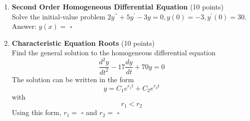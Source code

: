 \begin{enumerate}
  \item \textbf{Second Order Homogeneous Differential Equation} (10 points)\\
  Solve the initial-value problem $2 y^{\prime \prime}+5 y^{\prime}-3 y=0, y(0)=-3, y^{\prime}(0)=30$.\\
  Answer: $y(x)=$ $\square$\\
  \begin{subanswer}
  \end{subanswer}

  \item \textbf{Characteristic Equation Roots} (10 points)\\
  Find the general solution to the homogeneous differential equation
  $$
  \frac{d^2 y}{d t^2}-17 \frac{d y}{d t}+70 y=0
  $$
  The solution can be written in the form
  $$
  y=C_1 e^{r_1 t}+C_2 e^{r_2 t}
  $$
  with
  $$
  r_1<r_2
  $$
  Using this form, $r_1=$ $\square$ and $r_2=$ $\square$\\
  \begin{subanswer}
  \end{subanswer}

  \newpage


\end{enumerate}
